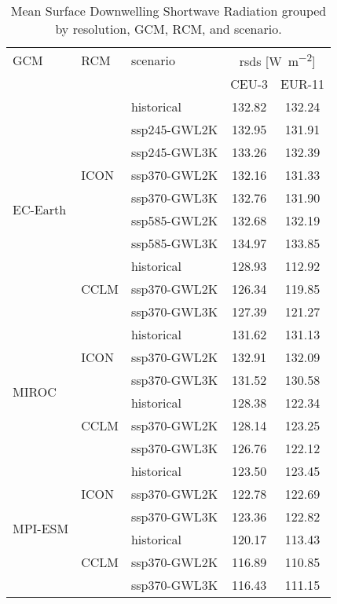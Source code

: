 \begin{table}[!htbp]
\centering
\caption{Mean Surface Downwelling Shortwave Radiation grouped by resolution, GCM, RCM, and scenario.}
\label{Table:rsds_mean_values}
\begin{tabular}{lll|cc}
\toprule
GCM & RCM & scenario & \multicolumn{2}{c}{rsds [\si{\watt\per\square\meter}]} \\
 &  &  & CEU-3 & EUR-11 \\
\midrule
\multirow{10}{*}{EC-Earth} & \multirow{7}{*}{ICON} & historical & 132.82 & 132.24 \\
 &  & ssp245-GWL2K & 132.95 & 131.91 \\
 &  & ssp245-GWL3K & 133.26 & 132.39 \\
 &  & ssp370-GWL2K & 132.16 & 131.33 \\
 &  & ssp370-GWL3K & 132.76 & 131.90 \\
 &  & ssp585-GWL2K & 132.68 & 132.19 \\
 &  & ssp585-GWL3K & 134.97 & 133.85 \\
\cmidrule(lr){2-5}
 & \multirow{3}{*}{CCLM} & historical & 128.93 & 112.92 \\
 &  & ssp370-GWL2K & 126.34 & 119.85 \\
 &  & ssp370-GWL3K & 127.39 & 121.27 \\
\cmidrule(lr){1-5}
\multirow{6}{*}{MIROC} & \multirow{3}{*}{ICON} & historical & 131.62 & 131.13 \\
 &  & ssp370-GWL2K & 132.91 & 132.09 \\
 &  & ssp370-GWL3K & 131.52 & 130.58 \\
\cmidrule(lr){2-5}
 & \multirow{3}{*}{CCLM} & historical & 128.38 & 122.34 \\
 &  & ssp370-GWL2K & 128.14 & 123.25 \\
 &  & ssp370-GWL3K & 126.76 & 122.12 \\
\cmidrule(lr){1-5}
\multirow{6}{*}{MPI-ESM} & \multirow{3}{*}{ICON} & historical & 123.50 & 123.45 \\
 &  & ssp370-GWL2K & 122.78 & 122.69 \\
 &  & ssp370-GWL3K & 123.36 & 122.82 \\
\cmidrule(lr){2-5}
 & \multirow{3}{*}{CCLM} & historical & 120.17 & 113.43 \\
 &  & ssp370-GWL2K & 116.89 & 110.85 \\
 &  & ssp370-GWL3K & 116.43 & 111.15 \\
\bottomrule
\end{tabular}
\end{table}
